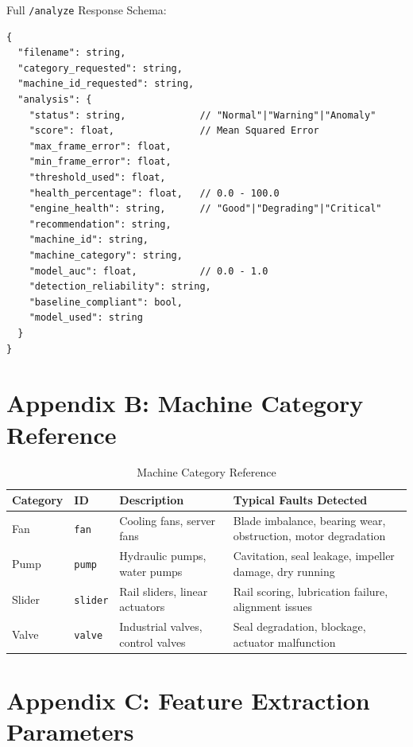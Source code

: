 \documentclass[10pt, a4paper, oneside]{report}
\begin{document}
Full \texttt{/analyze} Response Schema:

\begin{lstlisting}[caption={Complete /analyze Response Schema}]
{
  "filename": string,
  "category_requested": string,
  "machine_id_requested": string,
  "analysis": {
    "status": string,             // "Normal"|"Warning"|"Anomaly"
    "score": float,               // Mean Squared Error
    "max_frame_error": float,
    "min_frame_error": float,
    "threshold_used": float,
    "health_percentage": float,   // 0.0 - 100.0
    "engine_health": string,      // "Good"|"Degrading"|"Critical"
    "recommendation": string,
    "machine_id": string,
    "machine_category": string,
    "model_auc": float,           // 0.0 - 1.0
    "detection_reliability": string,
    "baseline_compliant": bool,
    "model_used": string
  }
}
\end{lstlisting}

\section*{Appendix B: Machine Category Reference}
\label{sec:appendix-b}

\begin{table}[H]
\centering
\caption{Machine Category Reference}
\label{tab:category-ref}
\begin{tabularx}{\textwidth}{l l l X}
  \toprule
  \textbf{Category} & \textbf{ID} & \textbf{Description} & \textbf{Typical Faults Detected} \\
  \midrule
  Fan    & \texttt{fan}    & Cooling fans, server fans   & Blade imbalance, bearing wear, obstruction, motor degradation \\
  Pump   & \texttt{pump}   & Hydraulic pumps, water pumps & Cavitation, seal leakage, impeller damage, dry running \\
  Slider & \texttt{slider} & Rail sliders, linear actuators & Rail scoring, lubrication failure, alignment issues \\
  Valve  & \texttt{valve}  & Industrial valves, control valves & Seal degradation, blockage, actuator malfunction \\
  \bottomrule
\end{tabularx}
\end{table}

\section*{Appendix C: Feature Extraction Parameters}
\label{sec:appendix-c}
\end{document}
